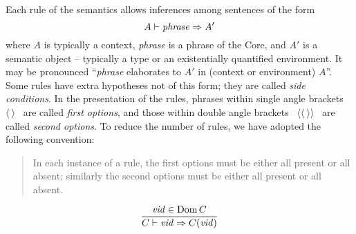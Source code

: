 Each rule of the semantics allows inferences among sentences of the form
\[A\vdash{\it phrase}\Rightarrow A'\]
where
$A$ is typically a context, {\it phrase} is a phrase of
the Core, and $A'$ is a semantic object -- typically a type or an
existentially quantified environment. 
It may be pronounced ``{\it phrase} elaborates to $A'$ in
(context or environment) $A$''.  Some rules have extra hypotheses not of
this form; they are called {\sl side conditions}.  
In the presentation of the rules, phrases within single
angle brackets ~$\langle\ \rangle$~ are called {\sl
first options}, and those within double
angle brackets ~$\langle\langle\ \rangle\rangle$~ are called {\sl
second options}.  To reduce the number of rules, we have adopted the
following convention:
\begin{quote} In each instance of a rule, the
first options must be either all present or all absent;
similarly the second options must be either all present or all absent.
\end{quote}



\begin{equation}	%
\label{idlongvid-rule}
\frac{\vid\in\Dom\C}
     {\C\ts\idlongid{\vid}\ra\C(\vid)}
\end{equation}

